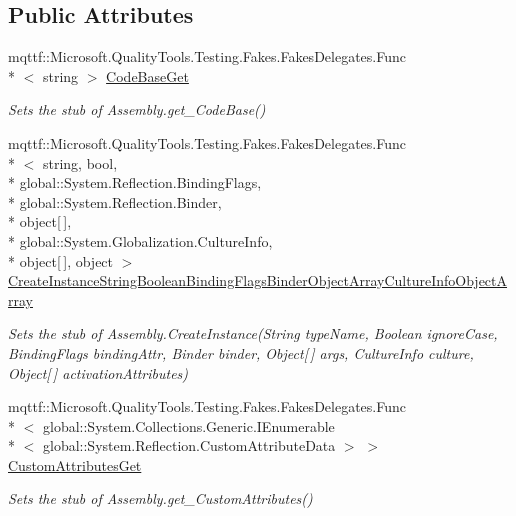\subsection*{Public Attributes}
\begin{DoxyCompactItemize}
\item 
mqttf\-::\-Microsoft.\-Quality\-Tools.\-Testing.\-Fakes.\-Fakes\-Delegates.\-Func\\*
$<$ string $>$ \hyperlink{class_system_1_1_reflection_1_1_fakes_1_1_stub_assembly_a93362f745ad0c349ef9ac66236d00a8e}{Code\-Base\-Get}
\begin{DoxyCompactList}\small\item\em Sets the stub of Assembly.\-get\-\_\-\-Code\-Base()\end{DoxyCompactList}\item 
mqttf\-::\-Microsoft.\-Quality\-Tools.\-Testing.\-Fakes.\-Fakes\-Delegates.\-Func\\*
$<$ string, bool, \\*
global\-::\-System.\-Reflection.\-Binding\-Flags, \\*
global\-::\-System.\-Reflection.\-Binder, \\*
object\mbox{[}$\,$\mbox{]}, \\*
global\-::\-System.\-Globalization.\-Culture\-Info, \\*
object\mbox{[}$\,$\mbox{]}, object $>$ \hyperlink{class_system_1_1_reflection_1_1_fakes_1_1_stub_assembly_a13316b45272a12be6b5f6039b1fdff94}{Create\-Instance\-String\-Boolean\-Binding\-Flags\-Binder\-Object\-Array\-Culture\-Info\-Object\-Array}
\begin{DoxyCompactList}\small\item\em Sets the stub of Assembly.\-Create\-Instance(\-String type\-Name, Boolean ignore\-Case, Binding\-Flags binding\-Attr, Binder binder, Object\mbox{[}$\,$\mbox{]} args, Culture\-Info culture, Object\mbox{[}$\,$\mbox{]} activation\-Attributes)\end{DoxyCompactList}\item 
mqttf\-::\-Microsoft.\-Quality\-Tools.\-Testing.\-Fakes.\-Fakes\-Delegates.\-Func\\*
$<$ global\-::\-System.\-Collections.\-Generic.\-I\-Enumerable\\*
$<$ global\-::\-System.\-Reflection.\-Custom\-Attribute\-Data $>$ $>$ \hyperlink{class_system_1_1_reflection_1_1_fakes_1_1_stub_assembly_a4c01ab0f6b0dd6580a83e238a2df5948}{Custom\-Attributes\-Get}
\begin{DoxyCompactList}\small\item\em Sets the stub of Assembly.\-get\-\_\-\-Custom\-Attributes()\end{DoxyCompactList}\item 

\end{DoxyCompactItemize}
